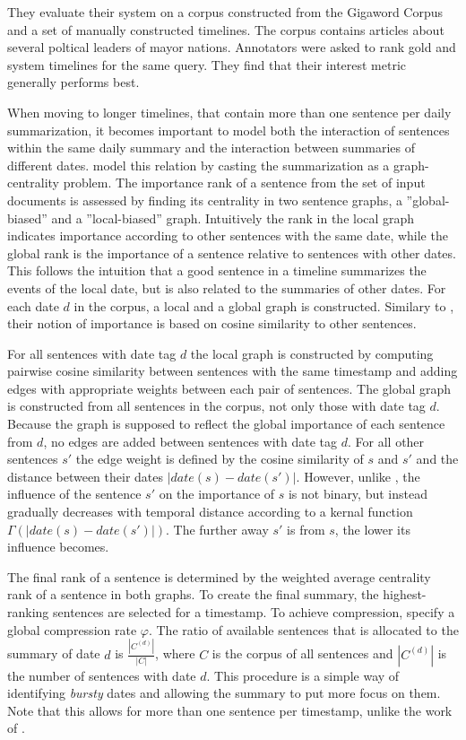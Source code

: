 \documentclass[a4paper,BCOR=10mm]{report}
\numberwithin{lemma}{chapter}
\numberwithin{definition}{chapter}
\begin{document}
They evaluate their system on a corpus constructed from the Gigaword Corpus \citep{gigaword} and a set of manually constructed timelines. The corpus contains articles about several poltical leaders of mayor nations. Annotators were asked to rank gold and system timelines for the same query.
They find that their interest metric generally performs best.

When moving to longer timelines, that contain more than one sentence per daily summarization, it becomes important to model both the interaction of sentences within the same daily summary and the interaction between summaries of different dates.
\citet{yan-trans} model this relation by casting the summarization as a graph-centrality problem.
The importance rank of a sentence from the set of input documents is assessed by finding its centrality in two sentence graphs, a ''global-biased'' and a ''local-biased'' graph.
Intuitively the rank in the local graph indicates importance according to other sentences with the same date, while the global rank is the importance of a sentence relative to sentences with other dates. This follows the intuition that a good sentence in a timeline summarizes the events of the local date, but is also related to the summaries of other dates. For each date $d$ in the corpus, a local and a global graph is constructed.
Similary to \citet{chieu}, their notion of importance is based on cosine similarity to other sentences.

For all sentences with date tag $d$ the local graph is constructed by computing pairwise cosine similarity between sentences with the same timestamp and adding edges with appropriate weights between each pair of sentences.
The global graph is constructed from all sentences in the corpus, not only those with date tag $d$. Because the graph is supposed to reflect the global importance of each sentence from $d$, no edges are added between sentences with date tag $d$.
For all other sentences $s'$ the edge weight is defined by the cosine similarity of $s$ and $s'$ and the distance between their dates $|\mathit{date}(s) - \mathit{date}(s')|$. However, unlike \citet{chieu}, the influence of the sentence $s'$ on the importance of $s$ is not binary, but instead gradually decreases with temporal distance according to a kernal function $\Gamma(|\mathit{date}(s) - \mathit{date}(s')|)$. The further away $s'$ is from $s$, the lower its influence becomes.

The final rank of a sentence is determined by the weighted average centrality rank of a sentence in both graphs.
To create the final summary, the highest-ranking sentences are selected for a timestamp. To achieve compression, \citeauthor{yan-trans} specify a global compression rate $\varphi$. The ratio of available sentences that is allocated to the summary of date $d$ is $\frac{|C^{(d)}|}{|C|}$, where $C$ is the corpus of all sentences and $|C^{(d)}|$ is the number of sentences with date $d$.
This procedure is a simple way of identifying \textit{bursty} dates and allowing the summary to put more focus on them.
Note that this allows for more than one sentence per timestamp, unlike the work of \citet{chieu}.
\end{document}
